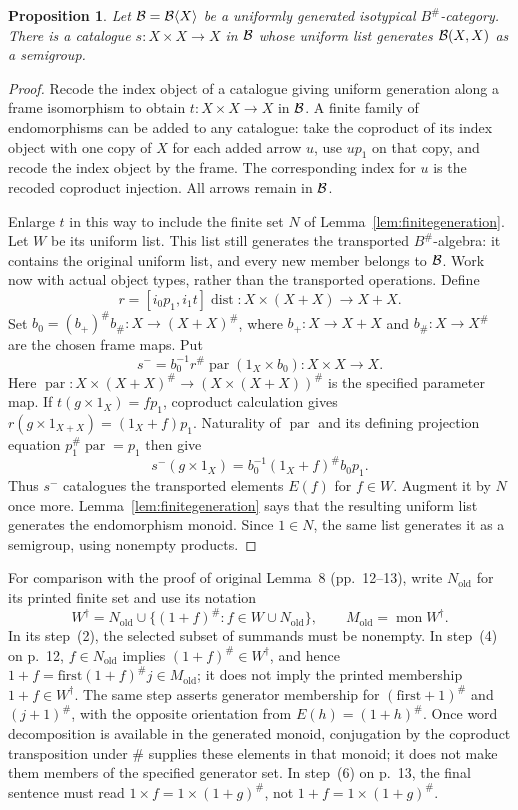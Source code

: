 \documentclass[11pt]{article}
\newtheorem{proposition}[theorem]{Proposition}
\newcommand{\dist}{\operatorname{dist}}\newcommand{\ass}{\operatorname{ass}}
\begin{document}
\begin{proposition}\label{prop:catalogue}
Let $\mathcal B=\mathcal B\langle X\rangle$ be a uniformly generated isotypical $B^\#$-category. There is a catalogue $s:X\times X\to X$ in $\mathcal B$ whose uniform list generates $\mathcal B(X,X)$ as a semigroup.
\end{proposition}
\begin{proof}
Recode the index object of a catalogue giving uniform generation along a frame isomorphism to obtain $t:X\times X\to X$ in $\mathcal B$. A finite family of endomorphisms can be added to any catalogue: take the coproduct of its index object with one copy of $X$ for each added arrow $u$, use $up_1$ on that copy, and recode the index object by the frame. The corresponding index for $u$ is the recoded coproduct injection. All arrows remain in $\mathcal B$.

Enlarge $t$ in this way to include the finite set $N$ of Lemma~\ref{lem:finitegeneration}. Let $W$ be its uniform list. This list still generates the transported $B^\#$-algebra: it contains the original uniform list, and every new member belongs to $\mathcal B$. Work now with actual object types, rather than the transported operations. Define
\[
r=[i_0p_1,i_1t]\dist:X\times(X+X)\longrightarrow X+X.
\]
Set $b_0=(b_+)^\#b_\#:X\to(X+X)^\#$, where $b_+:X\to X+X$ and $b_\#:X\to X^\#$ are the chosen frame maps. Put
\[
s^-=b_0^{-1}r^\#\operatorname{par}(1_X\times b_0):X\times X\to X.
\]
Here $\operatorname{par}:X\times(X+X)^\#\to(X\times(X+X))^\#$ is the specified parameter map. If $t(g\times1_X)=fp_1$, coproduct calculation gives
$r(g\times1_{X+X})=(1_X+f)p_1$.
Naturality of $\operatorname{par}$ and its defining projection equation $p_1^\#\operatorname{par}=p_1$ then give
\[
s^-(g\times1_X)=b_0^{-1}(1_X+f)^\#b_0p_1.
\]
Thus $s^-$ catalogues the transported elements $E(f)$ for $f\in W$. Augment it by $N$ once more. Lemma~\ref{lem:finitegeneration} says that the resulting uniform list generates the endomorphism monoid. Since $1\in N$, the same list generates it as a semigroup, using nonempty products.
\end{proof}

For comparison with the proof of original Lemma~8 (pp.~12--13), write
$N_{\mathrm{old}}$ for its printed finite set and use its notation
\[
W^\dagger=N_{\mathrm{old}}
 \cup\{(1+f)^\#:f\in W\cup N_{\mathrm{old}}\},
\qquad M_{\mathrm{old}}=\operatorname{mon}W^\dagger.
\]
In its step~(2), the selected subset of summands must be nonempty.
In step~(4) on p.~12, $f\in N_{\mathrm{old}}$ implies
$(1+f)^\#\in W^\dagger$, and hence
$1+f=\mathrm{first}(1+f)^\#j\in M_{\mathrm{old}}$;
it does not imply the printed membership $1+f\in W^\dagger$.
The same step asserts generator membership for
$(\mathrm{first}+1)^\#$ and $(j+1)^\#$, with the opposite
orientation from $E(h)=(1+h)^\#$. Once word decomposition is
available in the generated monoid, conjugation by the coproduct
transposition under $\#$ supplies these elements in that monoid;
it does not make them members of the specified generator set.
In step~(6) on p.~13, the final sentence must read
$1\times f=1\times(1+g)^\#$, not
$1+f=1\times(1+g)^\#$.
\end{document}

